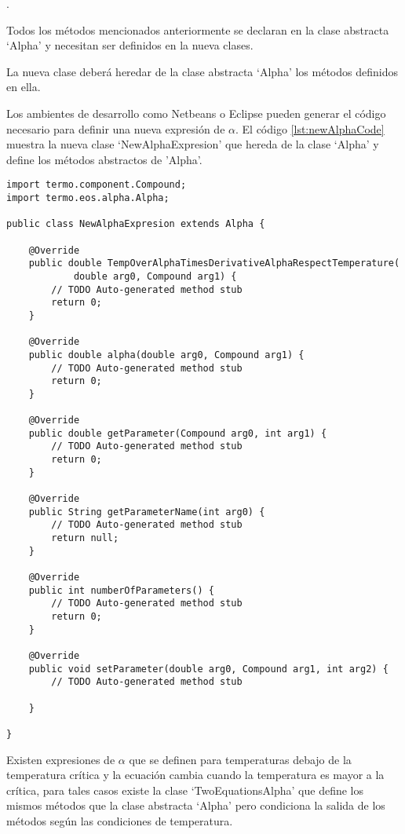 	.

	Todos los métodos mencionados anteriormente se declaran en la clase abstracta `Alpha' y necesitan ser definidos en la nueva clases. 

	La nueva clase deberá heredar de la clase abstracta `Alpha' los métodos definidos en ella.

	Los ambientes de desarrollo como Netbeans o Eclipse pueden generar el código necesario para definir una nueva expresión de $\alpha$. El código \ref{lst:newAlphaCode} muestra la nueva clase `NewAlphaExpresion' que hereda de la clase `Alpha' y define los métodos abstractos de 'Alpha'.


	\begin{lstlisting}[caption={Esqueleto para la creación de una nueva expresión de $\alpha$ para la librería materia, generado con el ambiente de desarrollo Eclipse},label={lst:newAlphaCode}]
import termo.component.Compound;
import termo.eos.alpha.Alpha;

public class NewAlphaExpresion extends Alpha {

	@Override
	public double TempOverAlphaTimesDerivativeAlphaRespectTemperature(
			double arg0, Compound arg1) {
		// TODO Auto-generated method stub
		return 0;
	}

	@Override
	public double alpha(double arg0, Compound arg1) {
		// TODO Auto-generated method stub
		return 0;
	}

	@Override
	public double getParameter(Compound arg0, int arg1) {
		// TODO Auto-generated method stub
		return 0;
	}

	@Override
	public String getParameterName(int arg0) {
		// TODO Auto-generated method stub
		return null;
	}

	@Override
	public int numberOfParameters() {
		// TODO Auto-generated method stub
		return 0;
	}

	@Override
	public void setParameter(double arg0, Compound arg1, int arg2) {
		// TODO Auto-generated method stub

	}

}

	\end{lstlisting}

	Existen expresiones de $\alpha$ que se definen para temperaturas debajo de la temperatura crítica y la ecuación cambia cuando la temperatura es mayor a la crítica, para tales casos existe la clase `TwoEquationsAlpha' que define los mismos métodos que la clase abstracta `Alpha' pero condiciona la salida de los métodos según las condiciones de temperatura. 

